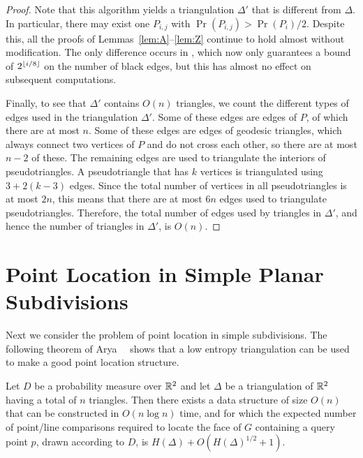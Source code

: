 \documentclass[lotsofwhite]{patmorin}
\begin{document}
\begin{proof}
Note that this algorithm yields a triangulation $\Delta'$ that is
different from $\Delta$.  In particular, there may exist one $P_{i,j}$
with $\Pr(P_{i,j})>\Pr(P_i)/2$.  Despite this, all the proofs of
Lemmas~\ref{lem:A}--\ref{lem:Z} continue to hold almost without modification.
The only difference occurs in , which now only
guarantees a bound of $2^{\left\lfloor i/8 \right\rfloor}$ on the number of black edges,
but this has almost no effect on subsequent computations.

Finally, to see that $\Delta'$ contains $O(n)$
triangles, we count the different types of edges used in the
triangulation $\Delta'$.  Some of these edges are edges of $P$, of
which there are at most $n$.  Some of these edges are edges of
geodesic triangles,
which always connect two vertices of $P$ and do not cross each other,
so there are at most $n-2$ of these.  The remaining edges are used to
triangulate the interiors of pseudotriangles.  A pseudotriangle that has $k$ vertices
is triangulated using $3 + 2(k-3)$ edges.  Since the total number of
vertices in all pseudotriangles is at most $2n$, this means that there are at
most $6n$ edges used to triangulate pseudotriangles.  Therefore, the total
number of edges used by triangles in $\Delta'$, and hence the number
of triangles in $\Delta'$, is $O(n)$.  
\end{proof}

\section{Point Location in Simple Planar Subdivisions}

Next we consider the problem of point location in simple
subdivisions.  The following theorem of Arya~\etal~\cite{ammw07}
shows that a low entropy triangulation can be used to make a good
point location structure.

\begin{thm}
Let $D$ be a probability measure over $\mathbb{R}^2$ and let $\Delta$ be a
triangulation of $\mathbb{R}^2$ having a total of $n$ triangles.  Then there exists a
data structure of size $O(n)$ that can be constructed in $O(n\log n)$
time, and for which the expected number of point/line comparisons
required to locate the face of $G$ containing a query point $p$, drawn
according to $D$, is $H(\Delta) + O(H(\Delta)^{1/2}+1)$.
\end{thm}
\end{document}
